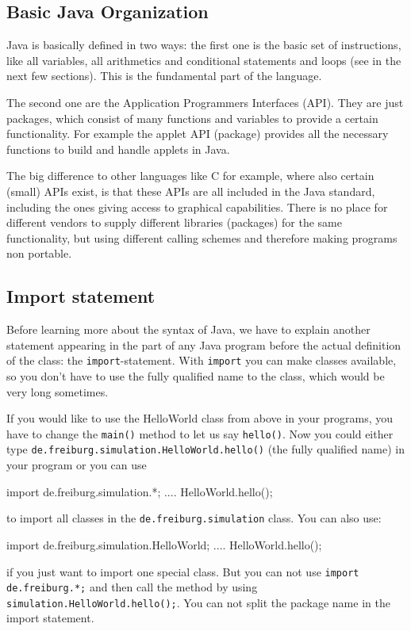 \subsection{Basic Java Organization}
Java is basically defined in two ways: the first one is the basic
set of instructions, like all variables, all arithmetics and conditional
statements and loops (see in the next few sections). This is the
fundamental part of the language. 

The second one are the Application Programmers Interfaces (API).
They are just packages, which consist of many functions and variables
to provide a certain functionality. For example the applet API (package)
provides all the necessary functions to build and handle applets
in Java. 

The big difference to other languages like C for example, where also
certain (small) APIs exist, is that these APIs are all included
in the Java standard, including the ones giving access to graphical
capabilities. There is no place for different vendors to supply
different libraries (packages) for the same functionality, but
using different calling schemes and therefore making programs
non portable. 

\subsection{Import statement}
Before learning more about the syntax of Java, we have to explain another
statement appearing in the part of any Java program before the actual
definition of the class: the \verb|import|-statement. With \verb|import|
you can make classes available, so you don't have to use the fully
qualified name to the class, which would be very long sometimes. 

If you would like to
use the HelloWorld class from above in your programs, you have to change
the \verb|main()| method to let us say \verb|hello()|. 
Now you could either
type \verb|de.freiburg.simulation.HelloWorld.hello()| (the fully qualified 
name) in your program or you can use
\begin{sverbatim}
import de.freiburg.simulation.*;
....
   HelloWorld.hello();
\end{sverbatim}
to import all classes in the \verb|de.freiburg.simulation| class.
You can also use:
\begin{sverbatim}
import de.freiburg.simulation.HelloWorld;
....
   HelloWorld.hello();
\end{sverbatim}
if you just want to import one special class. But you can not use 
\verb|import de.freiburg.*;| and then call the method by using
\verb|simulation.HelloWorld.hello();|. You can not split the
package name in the import statement.

